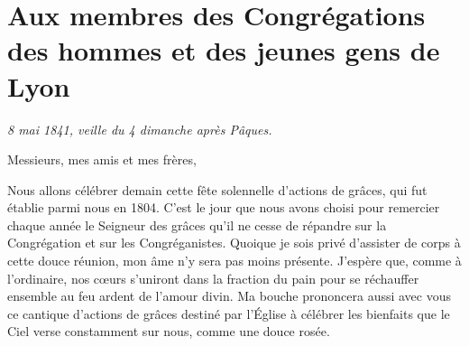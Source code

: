\chapter*{Aux membres des Congrégations des hommes et des jeunes gens de Lyon}

\begin{center}
\textit{8 mai 1841, veille du 4 dimanche après Pâques.}
\end{center}

Messieurs, mes amis et mes frères,

Nous allons célébrer demain cette fête solennelle d'actions de grâces, qui fut établie parmi nous en 1804. C'est le jour que nous avons choisi pour remercier chaque année le Seigneur des grâces qu'il ne cesse de répandre sur la Congrégation et sur les Congréganistes. Quoique je sois privé d'assister de corps à cette douce réunion, mon âme n'y sera pas moins présente. J'espère que, comme à l'ordinaire, nos cœurs s'uniront dans la fraction du pain pour se réchauffer ensemble au feu ardent de l'amour divin. Ma bouche prononcera aussi avec vous ce cantique d'actions de grâces destiné par l'Église à célébrer les bienfaits que le Ciel verse constamment sur nous, comme une douce rosée.

